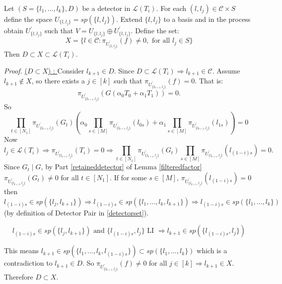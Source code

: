 \documentclass[letterpaper,USenglish,numberwithinsect]{lipics}
\newcommand{\ML}{\mathcal{L}}
\newcommand{\MC}{\mathcal{C}}
\begin{document}
\begin{lemma} \label{detectorexpansionproof}
Let $(S=\{l_{1},\ldots,l_{k}\},D)$ be a detector in $\ML(T_i)$. For each
$(l,l_j) \in \MC \times S$ define the space $U_{\{l,l_j\}} = sp(\{l,l_j\})$.
Extend $\{l,l_j\}$ to a basis and in the process obtain $U_{\{l,l_j\}}^\prime$
such that $V = U_{\{l,l_j\}}\oplus U_{\{l,l_j\}}^\prime$. Define the set:
\[
 X = \{l\in \MC : \pi_{U^\prime_{\{l,l_j\}}}(f) \neq 0, \text{  for all }
l_j\in S\}
\]
Then $D\subset X\subset \ML(T_i)$.
\end{lemma}

\emph{Proof.}
\underline{($D\subset X$) : } Consider $l_{k+1} \in D$. Since $D\subset
\ML(T_i)
\Rightarrow l_{k+1}\in \MC$. Assume $l_{k+1}\notin X$, so there exists a $j\in
[k]$ such that
$\pi_{U^\prime_{\{l_{k+1},l_j\}}}(f)=0$. That is:
\[
\pi_{U_{\{l_{k+1},l_j\}}^\prime}(G(\alpha_0T_0+\alpha_1T_1))=0.
\]So
\[
\prod\limits_{t\in
[N_1]}\pi_{U_{\{l_{k+1},l_j\}}^\prime}(G_t)(\alpha_0\prod\limits_{s\in
[M]}\pi_{U_{\{l_{k+1},l_j\}}^\prime}(l_{0s})+ \alpha_1\prod\limits_{s\in
[M]}\pi_{U_{\{l_{k+1},l_j\}}^\prime}(l_{1s})) = 0
\]
Now
\[ l_{j}\in \ML(T_i)\Rightarrow
\pi_{U_{\{l_{k+1},l_j\}}^\prime}(T_i)=0\Rightarrow
\prod\limits_{t\in [N_1]}\pi_{U_{\{l_{k+1},l_j\}}^\prime}(G_t)\prod\limits_{s\in
[M]}\pi_{U_{\{l_{k+1},l_j\}}^\prime}(l_{(1-i)s})= 0.
\]
Since $G_t \mid G$, by Part \ref{retaineddetector} of
Lemma \ref{filteredfactor} $\pi_{U_{\{l_{k+1},l_j\}}^\prime}(G_t)\neq 0$ for all
$t\in [N_1]$. If
for some $s\in [M]$,
$\pi_{U_{\{l_{k+1},l_j\}}^\prime}(l_{(1-i)s})=0$ then
$l_{(1-i)s}\in sp(\{l_{j},l_{k+1}\})\Rightarrow l_{(1-i)s}\in
sp(\{l_{1},\ldots,l_{k},l_{k+1}\})
\Rightarrow l_{(1-i)s}\in sp(\{l_{1},\ldots,l_{k}\}) $ (by definition of
Detector
Pair in \ref{detectorset}).

\[
 l_{(1-i)s} \in sp(\{l_j,l_{k+1}\}) \text{ and } \{l_{(1-i)s},l_j\} \text{ LI }
\Rightarrow l_{k+1}\in sp(\{l_{(1-i)s},l_j\})
\]

This means $l_{k+1}\in sp(\{l_{1},\ldots,l_{k},l_{(1-i)s}\})\subset
sp(\{l_1,\ldots,l_k\})$ which is a contradiction to $l_{k+1}\in D$.
So $\pi_{U_{\{l_{k+1},l_j\}}^\prime}(f)\neq 0$ for all $j\in [k]
 \Rightarrow l_{k+1}\in X$. Therefore $D\subset X$.\\
\end{document}
